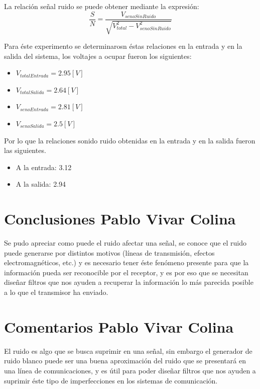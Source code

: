 \documentclass{article}
\begin{document}
La relación señal ruido se puede obtener mediante la expresión:\\

\begin{equation}
    \frac{S}{N}=\frac{V_{senoSinRuido}}{\sqrt{V_{total}^2-V_{senoSinRuido}^2}}
\end{equation}

Para éste experimento se determinarosn éstas relaciones en la entrada y en la salida del sistema, los voltajes a ocupar fueron los siguientes:\\

\begin{itemize}
    \item $V_{totalEntrada}=2.95[V]$
    \item $V_{totalSalida}=2.64[V]$
    \item $V_{senoEntrada}=2.81[V]$
    \item $V_{senoSalida}=2.5[V]$
\end{itemize}

Por lo que la relaciones sonido ruido obtenidas en la entrada y en la salida fueron las siguientes.\\

\begin{itemize}
    \item A la entrada: 3.12
    \item A la salida: 2.94
\end{itemize}

\section{Conclusiones Pablo Vivar Colina}

Se pudo apreciar como puede el ruido afectar una señal, se conoce que el ruido puede generarse por distintos motivos (líneas de transmisión, efectos electromagnéticos, etc.) y es necesario tener éste fenómeno presente para que la información pueda ser reconocible por el receptor, y es por eso que se necesitan diseñar filtros que nos ayuden a recuperar la información lo más parecida posible a lo que el transmisor ha enviado.

\section{Comentarios Pablo Vivar Colina}

El ruido es algo que se busca suprimir en una señal, sin embargo el generador de ruido blanco puede ser una buena aproximación del ruido que se presentará en una línea de comunicaciones, y es útil para poder diseñar filtros que nos ayuden a suprimir éste tipo de imperfecciones en los sistemas de comunicación.



\end{document}
